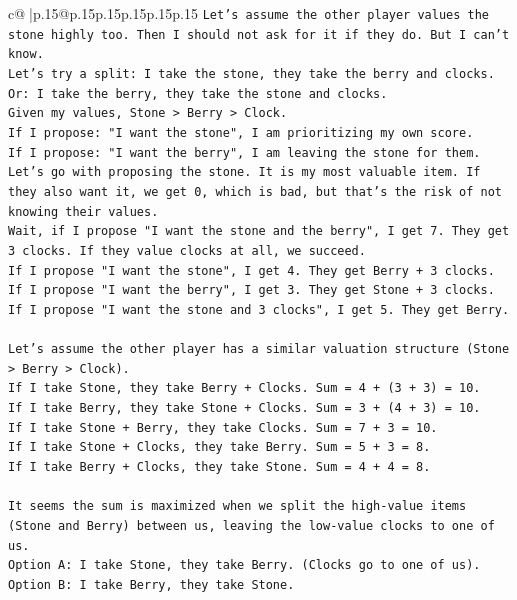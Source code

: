 \documentclass{article}
\begin{document}
{\begin{supertabular}{c@{$\;$}|p{.15\linewidth}@{}p{.15\linewidth}p{.15\linewidth}p{.15\linewidth}p{.15\linewidth}p{.15\linewidth}}
{{{\texttt{Let's assume the other player values the stone highly too. Then I should not ask for it if they do. But I can't know.} \\
\texttt{Let's try a split: I take the stone, they take the berry and clocks.} \\
\texttt{Or: I take the berry, they take the stone and clocks.} \\
\texttt{Given my values, Stone > Berry > Clock.} \\
\texttt{If I propose: "I want the stone", I am prioritizing my own score.} \\
\texttt{If I propose: "I want the berry", I am leaving the stone for them.} \\
\texttt{Let's go with proposing the stone. It is my most valuable item. If they also want it, we get 0, which is bad, but that's the risk of not knowing their values.} \\
\texttt{Wait, if I propose "I want the stone and the berry", I get 7. They get 3 clocks. If they value clocks at all, we succeed.} \\
\texttt{If I propose "I want the stone", I get 4. They get Berry + 3 clocks.} \\
\texttt{If I propose "I want the berry", I get 3. They get Stone + 3 clocks.} \\
\texttt{If I propose "I want the stone and 3 clocks", I get 5. They get Berry.} \\
\\ 
\texttt{Let's assume the other player has a similar valuation structure (Stone > Berry > Clock).} \\
\texttt{If I take Stone, they take Berry + Clocks. Sum = 4 + (3 + 3) = 10.} \\
\texttt{If I take Berry, they take Stone + Clocks. Sum = 3 + (4 + 3) = 10.} \\
\texttt{If I take Stone + Berry, they take Clocks. Sum = 7 + 3 = 10.} \\
\texttt{If I take Stone + Clocks, they take Berry. Sum = 5 + 3 = 8.} \\
\texttt{If I take Berry + Clocks, they take Stone. Sum = 4 + 4 = 8.} \\
\\ 
\texttt{It seems the sum is maximized when we split the high{-}value items (Stone and Berry) between us, leaving the low{-}value clocks to one of us.} \\
\texttt{Option A: I take Stone, they take Berry. (Clocks go to one of us).} \\
\texttt{Option B: I take Berry, they take Stone.} \\
}}}
\end{supertabular}}
\end{document}
